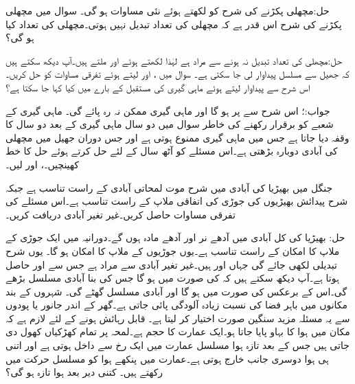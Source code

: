 حل:مچھلی پکڑنے کی شرح کو  لکھتے ہوئے نئی مساوات  ہو گی۔ 
سوال  میں مچھلی پکڑنے کی شرح اس قدر ہے کہ مچھلی کی تعداد تبدیل نہیں ہوتی۔مچھلی کی تعداد کیا ہو گی؟

حل:مچھلی کی تعداد تبدیل نہ ہونے سے مراد  ہے لہٰذا  لکھتے ہوئے  اور  ملتے ہیں۔آپ دیکھ سکتے ہیں کہ جھیل سے مسلسل  پیداوار لی جا سکتی ہے۔
سوال  میں ،  اور  لیتے ہوئے تفرقی مساوات کو حل کریں۔ اس شرح سے پیداوار لیتے ہوئے ماہی گیری کی مستقبل کے بارے میں کیا کہا جا سکتا ہے؟

جواب:؛ اس شرح سے  پر  ہو گا اور ماہی گیری ممکن نہ رہ پائے گی۔
ماہی گیری کے شعبے کو برقرار رکھنے کی خاطر سوال  میں دو سال ماہی گیری کے بعد دو سال کا وقفہ دیا جاتا ہے جس میں ماہی گیری ممنوع ہوتی ہے اور جس دوران جھیل میں مچھلی کی آبادی دوبارہ بڑھتی ہے۔اس مسئلے کو آٹھ سال کے لئے حل کرتے ہوئے حل کا خط کھینچیں۔،  اور  لیں۔
  

جنگل میں بھیڑیا کی آبادی میں شرح موت لمحاتی آبادی کے راست تناسب ہے جبکہ شرح پیدائش بھیڑیوں کی جوڑی کی  اتفاقی ملاپ کے راست تناسب ہے۔اس مسئلے کی تفرقی مساوات حاصل کریں۔غیر تغیر آبادی دریافت کریں۔

 حل: بھیڑیا کی کل آبادی  میں آدھے نر اور آدھے مادہ ہوں گے۔دورانیہ  میں ایک جوڑی کے ملاپ کا امکان   کے راست تناسب ہے۔یوں  جوڑیوں کے ملاپ کا امکان  ہو گا۔ یوں شرح تبدیلی  لکھی جائے گی جہاں  اور  ہیں۔غیر تغیر آبادی سے مراد  ہے  جس سے  اور  حاصل ہوتا ہے۔آپ دیکھ سکتے ہیں کہ  کی صورت میں  ہو گا جس کی بنا آبادی مسلسل بڑھے گی۔اس کے برعکس  کی صورت میں  ہو گا اور آبادی مسلسل گھٹے گی۔
شہروں کے بند مکانوں میں باہر فضا کی نسبت زیادہ  آلودگی پائی جاتی ہے۔گھر کے اندر جانور یا پودوں سے یہ مسئلہ مزید سنگین صورت اختیار کر لیتا ہے۔ قابل رہائش ہونے کے لئے لازم ہے کہ مکان میں ہوا کا بہاو پایا جاتا ہو۔ایک عمارت کا حجم  ہے۔لمحہ  پر تمام کھڑکیاں کھول دی جاتی ہیں جس کے بعد
   تازہ ہوا مسلسل عمارت میں ایک رخ سے داخل ہوتی ہے اور اتنی ہی ہوا دوسری جانب خارج ہوتی ہے۔عمارت میں پنکھے ہوا کو مسلسل حرکت میں رکھتے ہیں۔ کتنی دیر بعد  ہوا تازہ ہو گی؟

